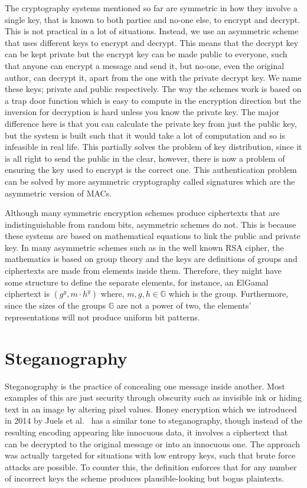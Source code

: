 \documentclass[ %
                    author={Samuel Russell},
                supervisor={Prof. Bogdan Warinschi},
                    degree={MEng},
                     title={Innocuous Ciphertexts},
                  subtitle={The DE-CENSOR Scheme},
                      type={Research},
                      year={2018} ]{dissertation}
\begin{document}
The cryptography systems mentioned so far are symmetric in how they involve a single key, that is known to both parties and no-one else, to encrypt and decrypt.
This is not practical in a lot of situations.
Instead, we use an asymmetric scheme that uses different keys to encrypt and decrypt.
This means that the decrypt key can be kept private but the encrypt key can be made public to everyone, such that anyone can encrypt a message and send it, but no-one, even the original author, can decrypt it, apart from the one with the private decrypt key.
We name these keys; private and public respectively.
The way the schemes work is based on a trap door function which is easy to compute in the encryption direction but the inversion for decryption is hard unless you know the private key.
The major difference here is that you can calculate the private key from just the public key, but the system is built such that it would take a lot of computation and so is infeasible in real life.
This partially solves the problem of key distribution, since it is all right to send the public in the clear, however, there is now a problem of ensuring the key used to encrypt is the correct one.
This authentication problem can be solved by more asymmetric cryptography called signatures which are the asymmetric version of MACs.

Although many symmetric encryption schemes produce ciphertexts that are indistinguishable from random bits, asymmetric schemes do not.
This is because these systems are based on mathematical equations to link the public and private key.
In many asymmetric schemes such as in the well known RSA cipher, the mathematics is based on group theory and the keys are definitions of groups and ciphertexts are made from elements inside them.
Therefore, they might have some structure to define the separate elements, for instance, an ElGamal ciphertext is $(g^y, m \cdot h^y )$ where, $m,g,h \in \mathbb{G}$ which is the group.
Furthermore, since the sizes of the groups $\mathbb{G}$ are not a power of two, the elements' representations will not produce uniform bit patterns.

\section{Steganography}

Steganography is the practice of concealing one message inside another.
Most examples of this are just security through obscurity such as invisible ink or hiding text in an image by altering pixel values.
Honey encryption which we introduced in 2014 by Juels et al.~\cite{honey} has a similar tone to steganography, though instead of the resulting encoding appearing like innocuous data, it involves a ciphertext that can be decrypted to the original message or into an innocuous one.
The approach was actually targeted for situations with low entropy keys, such that brute force attacks are possible. To counter this, the definition enforces that for any number of incorrect keys the scheme produces plausible-looking but bogus plaintexts.
\end{document}

